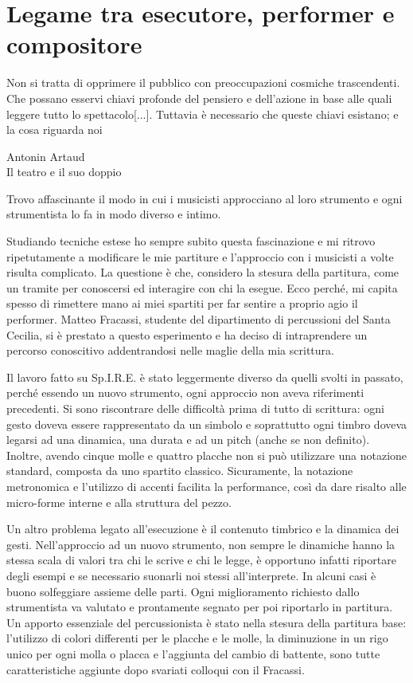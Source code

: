 
\section{Legame tra esecutore, performer e \newline compositore}

\epigraph{Non si tratta di opprimere il pubblico con preoccupazioni cosmiche trascendenti. Che possano esservi chiavi profonde del pensiero e dell'azione in base alle quali leggere tutto lo spettacolo[...].
Tuttavia è necessario che queste chiavi esistano; e la cosa riguarda noi}{Antonin Artaud \\ Il teatro e il suo doppio}

Trovo affascinante il modo in cui i musicisti approcciano al loro strumento e ogni strumentista lo fa in modo diverso e intimo. 

Studiando tecniche estese ho sempre subito questa fascinazione e mi ritrovo ripetutamente a modificare le mie partiture e l'approccio con i musicisti a volte risulta complicato. La questione è che, considero la stesura della partitura, come un tramite per conoscersi ed interagire con chi la esegue. Ecco perché, mi capita spesso di rimettere mano ai miei spartiti per far sentire a proprio agio il performer. Matteo Fracassi, studente del dipartimento di percussioni del Santa Cecilia, si è prestato a questo esperimento e ha deciso di intraprendere un percorso conoscitivo addentrandosi nelle maglie della mia scrittura.

Il lavoro fatto su Sp.I.R.E. è stato leggermente diverso da quelli svolti in passato, perché essendo un nuovo strumento, ogni approccio non aveva riferimenti precedenti. Si sono riscontrare delle difficoltà prima di tutto di scrittura: ogni gesto doveva essere rappresentato da un simbolo e soprattutto ogni timbro doveva legarsi ad una dinamica, una durata e ad un pitch (anche se non definito). Inoltre, avendo cinque molle e quattro placche non si può utilizzare una notazione standard, composta da uno spartito classico. Sicuramente, la notazione metronomica e l'utilizzo di accenti facilita la performance, così da dare risalto alle micro-forme interne e alla struttura del pezzo.

Un altro problema legato all'esecuzione è il contenuto timbrico e la dinamica dei gesti. Nell'approccio ad un nuovo strumento, non sempre le dinamiche hanno la stessa scala di valori tra chi le scrive e chi le legge, è opportuno infatti riportare degli esempi e se necessario suonarli noi stessi all'interprete. In alcuni casi è buono solfeggiare assieme delle parti. Ogni miglioramento richiesto dallo strumentista va valutato e prontamente segnato per poi riportarlo in partitura. Un apporto essenziale del percussionista è stato nella stesura della partitura base: l'utilizzo di colori differenti per le placche e le molle, la diminuzione in un rigo unico per ogni molla o placca e l'aggiunta del cambio di battente, sono tutte caratteristiche aggiunte dopo svariati colloqui con il Fracassi. 

